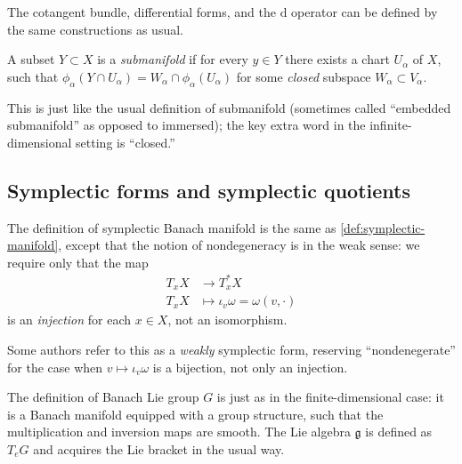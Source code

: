 \documentclass[12pt,letterpaper,reqno]{article}
\numberwithin{equation}{section}
\newcommand{\fg}{{\mathfrak g}}
\newcommand{\de}{\mathrm{d}}
\newcommand{\ti}[1]{\textit{#1}}
\newcommand{\fixme}[1]{{\color{orange}{[#1]}}}
\begin{document}
\begin{defn} The cotangent bundle,
differential forms, and the $\de$ operator can be defined by the same
constructions as usual.
\end{defn}

\begin{defn}[Submanifold] A subset $Y \subset X$ is a \ti{submanifold}
if for every $y \in Y$ there exists a chart $U_\alpha$ of $X$,
such that $\phi_\alpha(Y \cap U_\alpha) = W_\alpha \cap \phi_\alpha(U_\alpha)$
for some \ti{closed} subspace $W_\alpha \subset V_\alpha$.
\end{defn}

This is just like the usual definition of submanifold
(sometimes called ``embedded submanifold'' as opposed to immersed);
the key extra word in the infinite-dimensional setting
is ``closed.''



\subsection{Symplectic forms and symplectic quotients}

\begin{defn}
The definition of symplectic Banach manifold is the same as
\autoref{def:symplectic-manifold}, except that the notion
of nondegeneracy is in the weak sense: we require only that
the map
\begin{align}
  T_x X &\to T^*_x X \\
  T_x X &\mapsto \iota_v \omega = \omega(v,\cdot)
\end{align}
is an \ti{injection} for each $x \in X$,
not an isomorphism.
\end{defn}

Some authors refer to this as a \ti{weakly} symplectic
form, reserving ``nondenegerate'' for the case when
$v \mapsto \iota_v \omega$ is a bijection, not only an injection.

\begin{defn}
The definition of Banach Lie group $G$ is just as in the
finite-dimensional case: it is a
Banach manifold equipped with a group structure,
such that the multiplication and inversion maps
are smooth. The Lie algebra $\fg$ is defined as
$T_e G$ and acquires the Lie bracket in the usual way.
\fixme{ref Neeb on Infinite-Dimensional Lie Groups?}
\end{defn}
\end{document}
